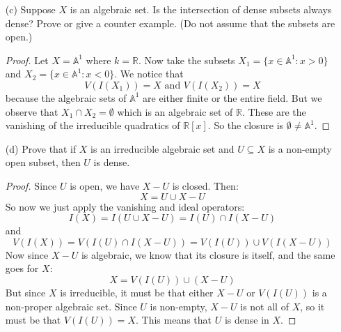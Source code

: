\documentclass{article}
\begin{document}
\begin{itemize}
        \item [(c)] Suppose $X$ is an algebraic set. Is the intersection of dense subsets always dense? Prove or give a counter example. (Do not assume that the subsets are open.)
            \begin{proof}
                Let $X = \mathbb{A}^{1}$ where $k = \mathbb{R}$. Now take the subsets $X_{1} = \{x \in \mathbb{A}^{1} : x > 0\}$ and $X_{2} = \{x \in \mathbb{A}^{1} : x < 0\}$. We notice that 
                    \begin{equation*}
                        V(I(X_{1})) = X \text{ and } V(I(X_{2})) = X
                    \end{equation*}
                because the algebraic sets of $\mathbb{A}^{1}$ are either finite or the entire field. But we observe that $X_{1} \cap X_{2} = \emptyset$ which is an algebraic set of $\mathbb{R}$. These are the vanishing of the irreducible quadratics of $\mathbb{R}[x]$. So the closure is $\emptyset \neq \mathbb{A}^{1}$.
            \end{proof}

        \item [(d)] Prove that if $X$ is an irreducible algebraic set and $U \subseteq X$ is a non-empty open subset, then $U$ is dense. 
            \begin{proof}
                Since $U$ is open, we have $X - U$ is closed. Then:
                    \begin{equation*}
                        X = U \cup X - U
                    \end{equation*}
                So now we just apply the vanishing and ideal operators:
                    \begin{equation*}
                        I(X) = I(U \cup X - U) = I(U) \cap I(X - U)
                    \end{equation*}
                and 
                    \begin{equation*}
                        V(I(X)) = V(I(U) \cap  I(X - U)) = V(I(U)) \cup V(I(X - U))
                    \end{equation*}
                Now since $X - U$ is algebraic, we know that its closure is itself, and the same goes for $X$:
                    \begin{equation*}
                        X = V(I(U)) \cup (X - U)
                    \end{equation*}
                But since $X$ is irreducible, it must be that either $X - U$ or $V(I(U))$ is a non-proper algebraic set. Since $U$ is non-empty, $X - U$ is not all of $X$, so it must be that $V(I(U)) = X$. This means that $U$ is dense in $X$.
            \end{proof}
    \end{itemize}
\end{document}
